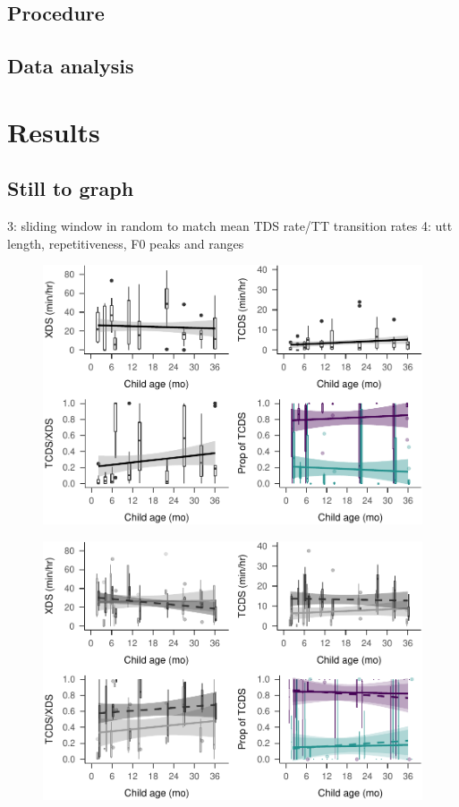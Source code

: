 \documentclass[man]{apa6}
\theoremstyle{definition}
\theoremstyle{definition}
\theoremstyle{definition}
\theoremstyle{remark}
\begin{document}
\subsection{Procedure}\label{procedure}

\subsection{Data analysis}\label{data-analysis}

\section{Results}\label{results}

\subsection{Still to graph}\label{still-to-graph}

3: sliding window in random to match mean TDS rate/TT transition rates
4: utt length, repetitiveness, F0 peaks and ranges

\begin{figure}
\centering
\includegraphics{Tseltal-CLE_files/figure-latex/plot_XDS_TDS_quantity_random-1.pdf}
\caption{}
\end{figure}

\begin{figure}
\centering
\includegraphics{Tseltal-CLE_files/figure-latex/plot_XDS_TDS_quantity_nonrandom-1.pdf}
\caption{}
\end{figure}
\end{document}
